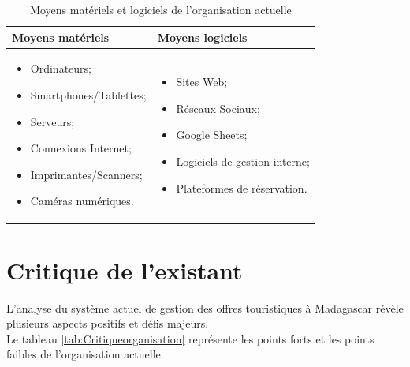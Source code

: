 \documentclass[12pt]{report}
\begin{document}
				\begin{longtable}{|p{7.5cm}|p{7.5cm}|}
				  \caption{Moyens matériels et logiciels de l'organisation actuelle}
				  \label{tab:materielsLogicielsOrganisationAct}\\
				      \hline
					    \textbf{Moyens matériels} & \textbf{Moyens logiciels}\\
				      \hline
				\endfirsthead
				\endhead
					\begin{itemize}
						\item Ordinateurs;
						\item Smartphones/Tablettes;
						\item Serveurs;
						\item Connexions Internet;
						\item Imprimantes/Scanners;
						\item Caméras numériques.
					\end{itemize} & 
					\begin{itemize}
						\item Sites Web;
						\item Réseaux Sociaux;
						\item Google Sheets;
						\item Logiciels de gestion interne;
						\item Plateformes de réservation.
					\end{itemize}\\
				\hline

				\end{longtable}
				\FloatBarrier				

				\section{Critique de l'existant}

				\hspace{15pt} L'analyse du système actuel de gestion des offres touristiques à Madagascar révèle plusieurs aspects positifs et défis majeurs.\\
				
				Le tableau \ref{tab:Critiqueorganisation} représente les points forts et les points faibles de l'organisation actuelle.
\end{document}
